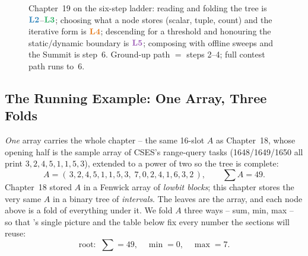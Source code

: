 \begin{figure}[H]
\centering
{}
\caption*{Chapter~19 on the six-step ladder: reading and folding the tree is
\(\lv2\)--\(\lv3\); choosing what a node stores (scalar, tuple, count) and the
iterative form is \(\lv4\); descending for a threshold and honouring the
static/dynamic boundary is \(\lv5\); composing with offline sweeps and the
Summit is step~6.  Ground-up path \(=\) steps 2--4; full contest path runs to~6.}
\end{figure}

\subsection*{The Running Example: One Array, Three Folds}

\emph{One} array carries the whole chapter -- the same 16-slot \(A\) as
Chapter~18, whose opening half is the sample array of CSES's range-query tasks
(1648/1649/1650 all print \(3,2,4,5,1,1,5,3\)), extended to a power of two so
the tree is complete:
\[
  A=(\,3,2,4,5,1,1,5,3,\;7,0,2,4,1,6,3,2\,),\qquad \textstyle\sum A = 49 .
\]
Chapter~18 stored \(A\) in a Fenwick array of \emph{lowbit blocks}; this
chapter stores the very same \(A\) in a binary tree of \emph{intervals}.  The
leaves are the array, and each node above is a fold of everything under it.  We
fold \(A\) three ways -- sum, min, max -- so that 's single
picture and the table below fix every number the sections will reuse:
\[
  \text{root: }\ \textstyle\sum=49,\quad \min=0,\quad \max=7 .
\]

